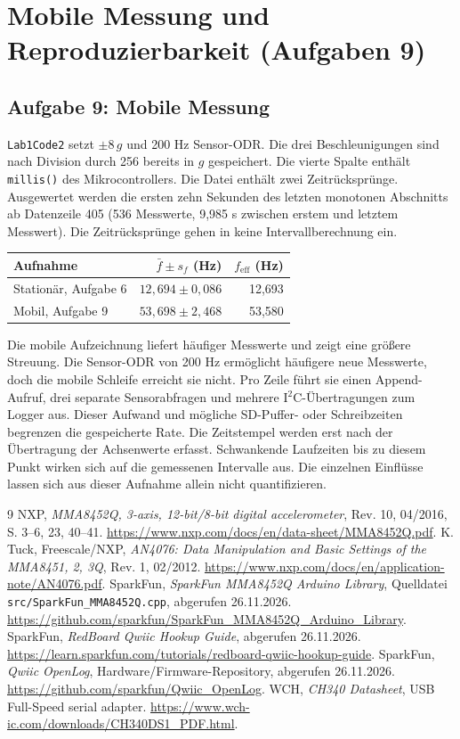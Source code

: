 \documentclass[a4paper,oneside,10pt]{article}
\begin{document}
\section{Mobile Messung und Reproduzierbarkeit (Aufgaben 9)}
\subsection*{Aufgabe 9: Mobile Messung}
\texttt{Lab1Code2} setzt $\pm8\,g$ und 200 Hz Sensor-ODR. Die drei
Beschleunigungen sind nach Division durch 256 bereits in $g$ gespeichert.
Die vierte Spalte enthält \texttt{millis()} des Mikrocontrollers. Die Datei
enthält zwei Zeitrücksprünge. Ausgewertet werden die ersten zehn Sekunden
des letzten monotonen Abschnitts ab Datenzeile 405 (536 Messwerte, 9,985 s
zwischen erstem und letztem Messwert). Die Zeitrücksprünge gehen in keine
Intervallberechnung ein.

\begin{center}
\begin{tabular}{l|r|r}
Aufnahme & $\bar f \pm s_f$ (Hz) & $f_\mathrm{eff}$ (Hz)\\\hline
Stationär, Aufgabe 6 & $12{,}694 \pm 0{,}086$ & 12,693\\
Mobil, Aufgabe 9 & $53{,}698 \pm 2{,}468$ & 53,580
\end{tabular}
\end{center}
Die mobile Aufzeichnung liefert häufiger Messwerte und zeigt eine größere
Streuung. Die Sensor-ODR von 200 Hz ermöglicht häufigere neue Messwerte,
doch die mobile Schleife erreicht sie nicht. Pro Zeile führt sie einen
Append-Aufruf, drei separate Sensorabfragen und mehrere I$^2$C-Übertragungen
zum Logger aus. Dieser Aufwand und mögliche SD-Puffer- oder Schreibzeiten
begrenzen die gespeicherte Rate. Die Zeitstempel werden erst nach der
Übertragung der Achsenwerte erfasst. Schwankende Laufzeiten bis zu diesem
Punkt wirken sich auf die gemessenen Intervalle aus. Die einzelnen Einflüsse
lassen sich aus dieser Aufnahme allein nicht quantifizieren.



\begingroup\small
\begin{thebibliography}{9}
 NXP, \emph{MMA8452Q, 3-axis, 12-bit/8-bit digital accelerometer},
Rev. 10, 04/2016, S. 3--6, 23, 40--41.
\url{https://www.nxp.com/docs/en/data-sheet/MMA8452Q.pdf}.
 K. Tuck, Freescale/NXP, \emph{AN4076: Data Manipulation and
Basic Settings of the MMA8451, 2, 3Q}, Rev. 1, 02/2012.
\url{https://www.nxp.com/docs/en/application-note/AN4076.pdf}.
 SparkFun, \emph{SparkFun MMA8452Q Arduino Library},
Quelldatei \texttt{src/SparkFun\_MMA8452Q.cpp}, abgerufen 26.11.2026.
\url{https://github.com/sparkfun/SparkFun_MMA8452Q_Arduino_Library}.
 SparkFun, \emph{RedBoard Qwiic Hookup Guide}, abgerufen 26.11.2026.
\url{https://learn.sparkfun.com/tutorials/redboard-qwiic-hookup-guide}.
 SparkFun, \emph{Qwiic OpenLog}, Hardware/Firmware-Repository,
abgerufen 26.11.2026. \url{https://github.com/sparkfun/Qwiic_OpenLog}.
 WCH, \emph{CH340 Datasheet}, USB Full-Speed serial adapter.
\url{https://www.wch-ic.com/downloads/CH340DS1_PDF.html}.
\end{thebibliography}
\endgroup
\end{document}
